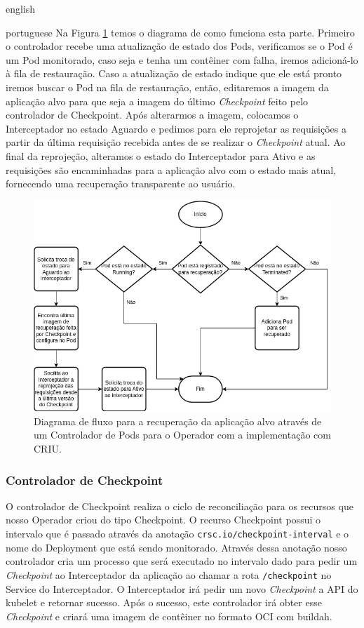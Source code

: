 \begin{otherlanguage*}{english}
\begin{otherlanguage*}{portuguese}
Na Figura \ref{fig:restore-pod} temos o diagrama de como funciona esta parte. Primeiro o
controlador recebe uma atualização de estado dos Pods, verificamos se o Pod é um Pod monitorado,
caso seja e tenha um contêiner com falha, iremos adicioná-lo à fila de restauração. Caso a
atualização de estado indique que ele está pronto iremos buscar o Pod na fila de restauração,
então, editaremos a imagem da aplicação alvo para que seja a imagem do último \textit{Checkpoint}
feito pelo controlador de Checkpoint. Após alterarmos a imagem, colocamos o Interceptador no
estado Aguardo e pedimos para ele reprojetar as requisições a partir da última requisição
recebida antes de se realizar o \textit{Checkpoint} atual. Ao final da reprojeção, alteramos
o estado do Interceptador para Ativo e as requisições são encaminhadas para a aplicação alvo
com o estado mais atual, fornecendo uma recuperação transparente ao usuário.

\begin{figure}[h!]
\centering
\includegraphics[scale=0.64]{images/restore-pod-criu.png}
\caption{Diagrama de fluxo para a recuperação da aplicação alvo através de um Controlador de Pods para o Operador com a implementação com CRIU.}
\label{fig:restore-pod}
\end{figure}

\subsubsection{Controlador de Checkpoint}

O controlador de Checkpoint realiza o ciclo de reconciliação para os recursos que nosso
Operador criou do tipo Checkpoint. O recurso Checkpoint possui o intervalo que é
passado através da anotação \texttt{crsc.io/checkpoint-interval} e o nome do Deployment
que está sendo monitorado. Através dessa anotação nosso controlador cria um processo que
será executado no intervalo dado para pedir um \textit{Checkpoint} ao Interceptador da
aplicação ao chamar a rota \texttt{/checkpoint} no Service do Interceptador. O Interceptador
irá pedir um novo \textit{Checkpoint} a API do kubelet e retornar sucesso. Após o sucesso,
este controlador irá obter esse \textit{Checkpoint} e criará uma imagem de contêiner no
formato OCI com buildah.


\end{otherlanguage*}
\end{otherlanguage*}
